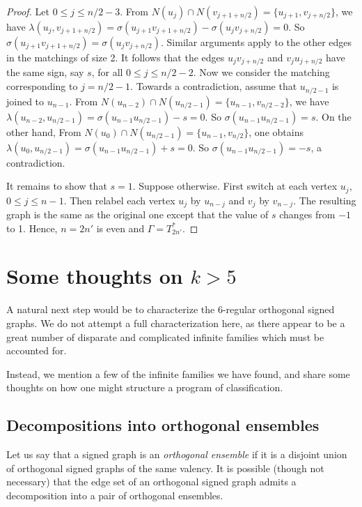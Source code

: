 \documentclass[11pt]{article}
\theoremstyle{plain}
\theoremstyle{definition}
\begin{document}
\begin{proof}
Let $0\leqslant j \leqslant n/2-3$.
From  $N(u_j)\cap N(v_{j+1+n/2})=\{u_{j+1},v_{j+n/2}\}$, we have
$\lambda(u_j,v_{j+1+n/2})=\sigma(u_{j+1}v_{j+1+n/2})-\sigma(u_{j}v_{j+n/2})=0.$
So  $\sigma(u_{j+1}v_{j+1+n/2})=\sigma(u_{j}v_{j+n/2})$.
 Similar arguments apply to the other  edges in the matchings of size 2. It follows that the edges $u_jv_{j+n/2}$ and
$v_ju_{j+n/2}$ have the same sign, say $s$, for all $0\leqslant j \leqslant n/2-2$.
Now we consider the matching corresponding to $j=n/2-1$. Towards a contradiction,  assume that  $u_{n/2-1}$ is joined to $u_{n-1}$.
From  $N(u_{n-2})\cap N(u_{n/2-1})=\{u_{n-1},v_{n/2-2}\}$, we have
$\lambda(u_{n-2},u_{n/2-1})=\sigma(u_{n-1}u_{n/2-1})-s=0.$
So  $\sigma(u_{n-1}u_{n/2-1})=s$.
On the other hand,
From  $N(u_0)\cap N(u_{n/2-1})=\{u_{n-1},v_{n/2}\}$, one obtains
$\lambda(u_{0},u_{n/2-1})=\sigma(u_{n-1}u_{n/2-1})+s=0.$
So $\sigma(u_{n-1}u_{n/2-1})=-s$, a contradiction.

It remains to show that $s=1$. Suppose otherwise.  First switch at each vertex $u_j$, $0\leqslant j\leqslant n-1$. Then relabel  each vertex $u_j$ by $u_{n-j}$
  and  $v_j$ by $v_{n-j}$.
The resulting graph is the same as the original one except that the value of $s$ changes from $-1$ to 1.
Hence, $n=2n'$ is even and $\Gamma=T_{2n'}^{\ast}$.
\end{proof} 

\section{Some thoughts on $k>5$}\label{Sec:Kgeq6}

A natural next step would be to characterize the 6-regular orthogonal signed graphs. We do not attempt a full characterization here, as there appear to be a great number of disparate and complicated infinite families which must be accounted for. 

Instead, we mention a few of the infinite families we have found, and share some thoughts on how one might structure a program of classification. 


\subsection{Decompositions into orthogonal ensembles} 
Let us say that a signed graph is an \textit{orthogonal ensemble} if it is a disjoint union of orthogonal signed graphs of the same valency. It is possible (though not necessary) that the edge set of an orthogonal signed graph admits a decomposition into a pair of orthogonal ensembles. 
\end{document}
